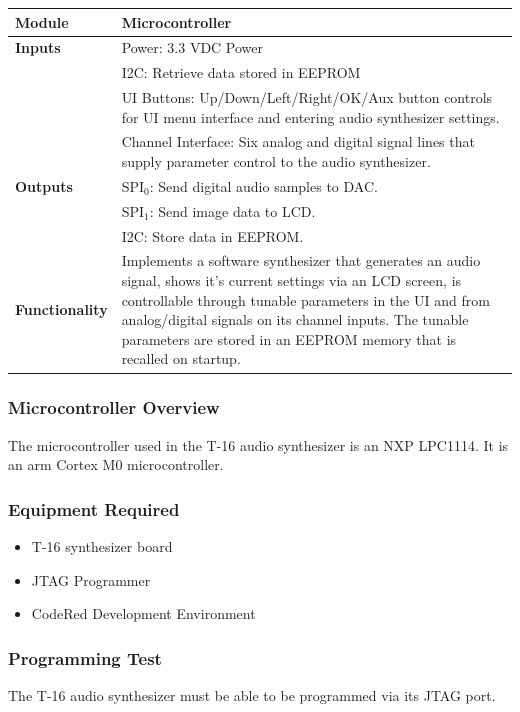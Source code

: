 \documentclass{article}
\begin{document}
\begin{tabular}{|p{1in}|p{5in}|}
\hline
\textbf{Module} & Microcontroller \\
\hline
\textbf{Inputs}& Power: 3.3 VDC Power\\
	     & I2C: Retrieve data stored in EEPROM\\
	     & UI Buttons: Up/Down/Left/Right/OK/Aux button controls for UI menu interface and entering audio synthesizer settings.\\
	     & Channel Interface: Six analog and digital signal lines that supply parameter control to the audio synthesizer.\\
\hline
\textbf{Outputs}& SPI$_0$: Send digital audio samples to DAC.\\
	      & SPI$_1$: Send image data to LCD.\\
	      & I2C: Store data in EEPROM.\\ 
\hline
\textbf{Functionality}& Implements a software synthesizer that generates an audio signal, shows it's current settings via an LCD screen, is controllable through tunable parameters in the UI and from analog/digital signals on its channel inputs. The tunable parameters are stored in an EEPROM memory that is recalled on startup.\\
\hline
\end{tabular}

\subsubsection{Microcontroller Overview}
The microcontroller used in the T-16 audio synthesizer is an NXP
LPC1114. It is an arm Cortex M0 microcontroller.

\subsubsection{Equipment Required}
\begin{itemize}
  \item T-16 synthesizer board
  \item JTAG Programmer
  \item CodeRed Development Environment 
\end{itemize}

\subsubsection{Programming Test} 
The T-16 audio synthesizer must be able to be programmed via its JTAG port. 
\end{document}
